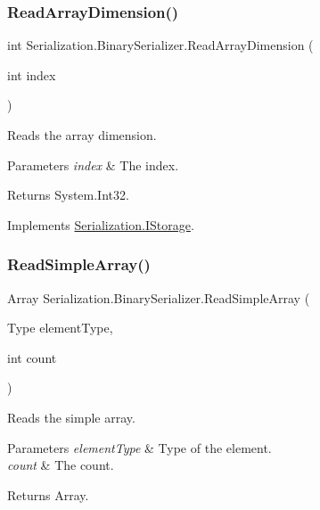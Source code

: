 \subsubsection{\texorpdfstring{Read\+Array\+Dimension()}{ReadArrayDimension()}}
{\footnotesize\ttfamily int Serialization.\+Binary\+Serializer.\+Read\+Array\+Dimension (\begin{DoxyParamCaption}\item[{int}]{index }\end{DoxyParamCaption})\hspace{0.3cm}{\ttfamily [inline]}}



Reads the array dimension. 


\begin{DoxyParams}{Parameters}
{\em index} & The index.\\
\hline
\end{DoxyParams}
\begin{DoxyReturn}{Returns}
System.\+Int32.
\end{DoxyReturn}


Implements \hyperlink{interface_serialization_1_1_i_storage_a395cc4c40bd55229df264d4187ebb018}{Serialization.\+I\+Storage}.

\mbox{\label{class_serialization_1_1_binary_serializer_a611b0f83ba611a0ecf394a9920dbab1b}} 
\subsubsection{\texorpdfstring{Read\+Simple\+Array()}{ReadSimpleArray()}}
{\footnotesize\ttfamily Array Serialization.\+Binary\+Serializer.\+Read\+Simple\+Array (\begin{DoxyParamCaption}\item[{Type}]{element\+Type,  }\item[{int}]{count }\end{DoxyParamCaption})\hspace{0.3cm}{\ttfamily [inline]}}



Reads the simple array. 


\begin{DoxyParams}{Parameters}
{\em element\+Type} & Type of the element.\\
\hline
{\em count} & The count.\\
\hline
\end{DoxyParams}
\begin{DoxyReturn}{Returns}
Array.
\end{DoxyReturn}


